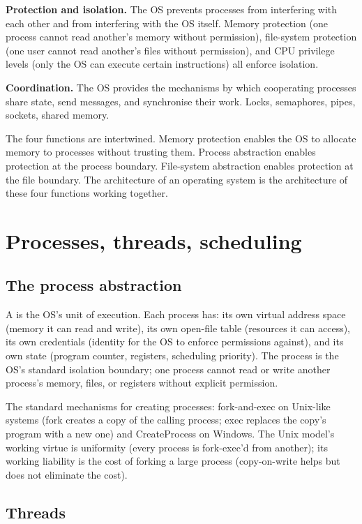 \textbf{Protection and isolation.} The OS prevents processes from interfering with each other and from interfering with the OS itself. Memory protection (one process cannot read another's memory without permission), file-system protection (one user cannot read another's files without permission), and CPU privilege levels (only the OS can execute certain instructions) all enforce isolation.

\textbf{Coordination.} The OS provides the mechanisms by which cooperating processes share state, send messages, and synchronise their work. Locks, semaphores, pipes, sockets, shared memory.

The four functions are intertwined. Memory protection enables the OS to allocate memory to processes without trusting them. Process abstraction enables protection at the process boundary. File-system abstraction enables protection at the file boundary. The architecture of an operating system is the architecture of these four functions working together.

\section{Processes, threads, scheduling}

\subsection{The process abstraction}

A  is the OS's unit of execution. Each process has: its own virtual address space (memory it can read and write), its own open-file table (resources it can access), its own credentials (identity for the OS to enforce permissions against), and its own state (program counter, registers, scheduling priority). The process is the OS's standard isolation boundary; one process cannot read or write another process's memory, files, or registers without explicit permission.

The standard mechanisms for creating processes: fork-and-exec on Unix-like systems (fork creates a copy of the calling process; exec replaces the copy's program with a new one) and CreateProcess on Windows. The Unix model's working virtue is uniformity (every process is fork-exec'd from another); its working liability is the cost of forking a large process (copy-on-write helps but does not eliminate the cost).

\subsection{Threads}

